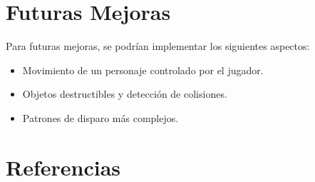 \documentclass[11pt]{article}
\begin{document}
  \section*{Futuras Mejoras}

  Para futuras mejoras, se podrían implementar los siguientes aspectos: 
  \begin{itemize}
    \item Movimiento de un personaje controlado por el jugador.
    \item Objetos destructibles y detección de colisiones.
    \item Patrones de disparo más complejos.
  \end{itemize}

  \section*{Referencias}
\end{document}
